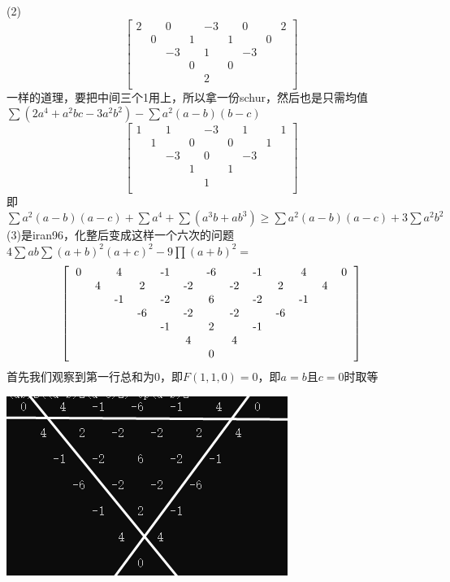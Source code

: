 \documentclass[UTF8]{ctexart}
\begin{document}
(2)\renewcommand*{\arraystretch}{1.732}\[\left[\begin{matrix}
	2& &0& &-3& &0& &2\\
	&0& &1& &1& &0&\\
	& &-3& &1& &-3& &\\
	& & &0& &0& & &\\
	& & & &2& & & &\\
\end{matrix}\right]\]
一样的道理，要把中间三个1用上，所以拿一份schur，然后也是只需均值\\
$ \displaystyle  \sum (2a^{4}+a^{2}bc-3a^{2}b^{2})-\displaystyle  \sum a^{2}(a-b)(b-c) $
\renewcommand*{\arraystretch}{1.732}\[\left[\begin{matrix}
	1& &1& &-3& &1& &1\\
	&1& &0& &0& &1&\\
	& &-3& &0& &-3& &\\
	& & &1& &1& & &\\
	& & & &1& & & &\\
\end{matrix}\right]\]
即$ \displaystyle \sum a^{2}(a-b)(a-c)+\displaystyle \sum a^{4}+\displaystyle \sum (a^{3}b+ab^{3})\geq \displaystyle \sum a^{2}(a-b)(a-c)+3\displaystyle \sum a^{2}b^{2}$\\
(3)是iran96，化整后变成这样一个六次的问题\\
$ 4\displaystyle \sum ab\displaystyle \sum (a+b)^{2}(a+c)^{2}-9\prod (a+b)^{2}= $
\renewcommand*{\arraystretch}{1.732}\[\left[\begin{matrix}
	\begin{tabular}{ccccccccccccc}
		0& &4& &-1& &-6& &-1& &4& &0\\
		&4& &2& &-2& &-2& &2& &4&\\
		& &-1& &-2& &6& &-2& &-1& &\\
		& & &-6& &-2& &-2& &-6& & &\\
		& & & &-1& &2& &-1& & & &\\
		& & & & &4& &4& & & & &\\
		& & & & & &0& & & & & &\\
	\end{tabular}
\end{matrix}\right]\]
首先我们观察到第一行总和为$ 0 $，即$ F(1,1,0)=0 $，即$ a=b $且$ c=0 $时取等
\begin{center}
	\includegraphics[width=0.4\linewidth]{220}
\end{center}
\end{document}
